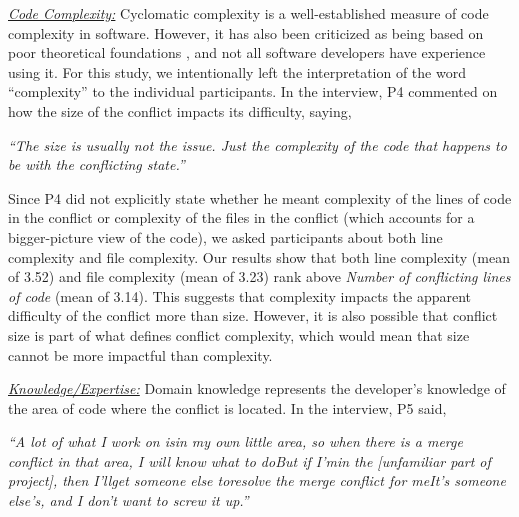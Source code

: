 \underline{\textit{Code Complexity:}} Cyclomatic complexity \cite{mccabe1976complexity} is a well-established measure of code complexity in software. However, it has also been criticized as being based on poor theoretical foundations \cite{Shepperd1988}, and not all software developers have experience using it. For this study, we intentionally left the interpretation of the word ``complexity'' to the individual participants.
In the interview, P4 commented on how the size of the conflict impacts its difficulty, saying,

\begin{displayquote}
\textit{``The size is usually not the issue. Just the complexity of the code that happens to be with the conflicting state.''}	
\end{displayquote}
Since P4 did not explicitly state whether he meant complexity of the lines of code in the conflict or complexity of the files in the conflict (which accounts for a bigger-picture view of the code), we asked participants about both line complexity and file complexity. Our results show that both line complexity (mean of 3.52) and file complexity (mean of 3.23) rank above \textit{Number of conflicting lines of code} (mean of 3.14). This suggests that complexity impacts the apparent difficulty of the conflict more than size. However, it is also possible that conflict size is part of what defines conflict complexity, which would mean that size cannot be more impactful than complexity. 

\underline{\textit{Knowledge/Expertise:}} Domain knowledge represents the developer's knowledge of the area of code where the conflict is located. In the interview, P5 said, 

\begin{displayquote}
	\textit{``A lot of what I work on is\textellipsis in my own little area, so when there is a merge conflict in that area, I will know what to do\textellipsis But if I'm\textellipsis in the [unfamiliar part of project], then I'll\textellipsis get someone else to\textellipsis resolve the merge conflict for me\textellipsis It's someone else's, and I don't want to screw it up.''}
\end{displayquote}


